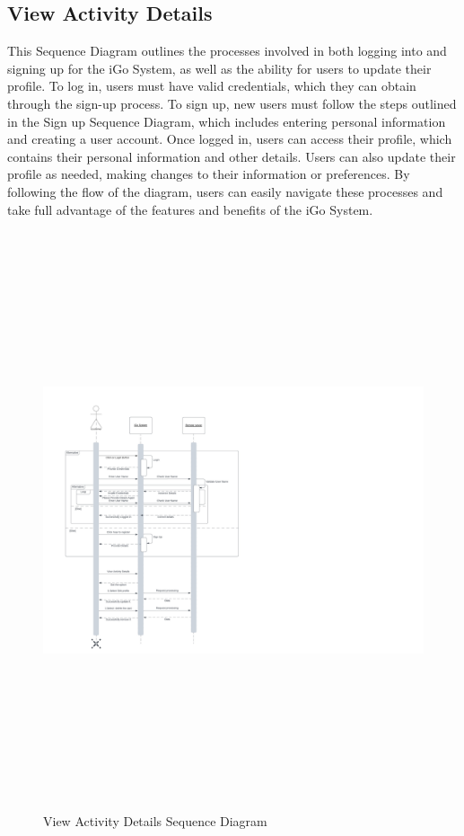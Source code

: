 \documentclass[a4paper, 11pt]{report}
\begin{document}
\subsection{View Activity Details}
This Sequence Diagram outlines the processes involved in both logging into and signing up for the iGo System, as well as the ability for users to update their profile. To log in, users must have valid credentials, which they can obtain through the sign-up process. To sign up, new users must follow the steps outlined in the Sign up Sequence Diagram, which includes entering personal information and creating a user account. Once logged in, users can access their profile, which contains their personal information and other details. Users can also update their profile as needed, making changes to their information or preferences. By following the flow of the diagram, users can easily navigate these processes and take full advantage of the features and benefits of the iGo System. 
\begin{figure}[h]
    \renewcommand{\thefigure}{7.2.3}
    \hspace{1cm}
    \includegraphics[scale=0.5,height=17cm]{ViewActivityDetails.jpeg}
    \caption{View Activity Details Sequence Diagram}
\end{figure}
\clearpage
\end{document}
